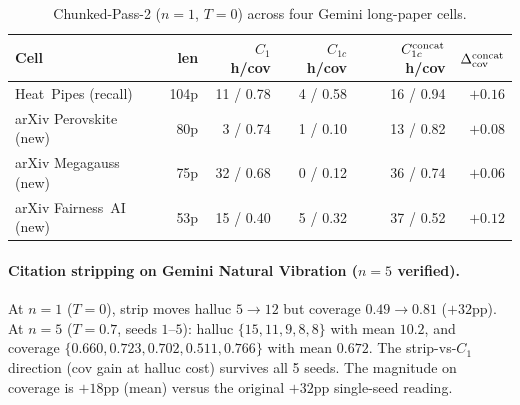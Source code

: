 \documentclass[11pt]{article}
\begin{document}
\begin{table}[h]
\centering
\caption{Chunked-Pass-2 ($n{=}1$, $T{=}0$) across four Gemini long-paper cells.}
\label{tab:mode_a_chunked_replication}
\small
\begin{tabular}{lrrrrr}
\toprule
Cell & len & $C_1$ h/cov & $C_{1c}$ h/cov & $C_{1c}^{\rm concat}$ h/cov & $\Delta_{\rm cov}^{\rm concat}$ \\
\midrule
Heat~Pipes (recall)    & 104p & 11 / 0.78 & 4 / 0.58 & 16 / 0.94 & $+0.16$ \\
arXiv Perovskite (new) &  80p & 3  / 0.74 & 1 / 0.10 & 13 / 0.82 & $+0.08$ \\
arXiv Megagauss (new)  &  75p & 32 / 0.68 & 0 / 0.12 & 36 / 0.74 & $+0.06$ \\
arXiv Fairness~AI (new)&  53p & 15 / 0.40 & 5 / 0.32 & 37 / 0.52 & $+0.12$ \\
\bottomrule
\end{tabular}
\end{table}

\begin{table}[h]
\centering
\small
\caption{Multi-seed verification of $C_{1c}^{\rm concat}$ on the three arXiv cells ($n{=}5$ seeds, Gemini~3.1~Pro Pass-2, $T{=}0.7$).}
\label{tab:chunked_multiseed_appdx}
\end{table}

\paragraph{Citation stripping on Gemini Natural Vibration ($n{=}5$ verified).}
At $n{=}1$ ($T{=}0$), strip moves halluc $5\to 12$ but coverage $0.49\to 0.81$ ($+32$pp). At $n{=}5$ ($T{=}0.7$, seeds $1$--$5$): halluc $\{15,11,9,8,8\}$ with mean $10.2$, and coverage $\{0.660, 0.723, 0.702, 0.511, 0.766\}$ with mean $0.672$. The strip-vs-$C_1$ direction (cov gain at halluc cost) survives all 5 seeds. The magnitude on coverage is $+18$pp (mean) versus the original $+32$pp single-seed reading.
\end{document}
